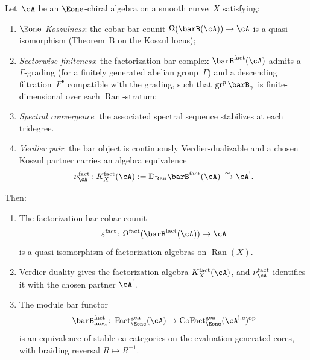 \begin{theorem}
\label{thm:h-level-factorization-kd}
Let~$\cA$ be an $\Eone$-chiral algebra on a smooth curve~$X$
satisfying:
\begin{enumerate}[label=\textup{(H\arabic*)}]
\item\label{h1:koszulness} \emph{$\Eone$-Koszulness}: the cobar-bar
 counit
 $\Omega(\barB(\cA)) \to \cA$ is a quasi-isomorphism
 \textup{(}Theorem~B on the Koszul locus\textup{)};
\item\label{h2:sectorwise} \emph{Sectorwise finiteness}: the
 factorization bar complex $\barB^{\mathrm{fact}}(\cA)$ admits a
 $\Gamma$-grading \textup{(}for a finitely generated abelian
 group~$\Gamma$\textup{)} and a descending
 filtration~$F^\bullet$ compatible with the grading, such that
 $\operatorname{gr}^p \barB_\gamma$ is finite-dimensional
 over each $\operatorname{Ran}$-stratum;
\item\label{h3:convergence} \emph{Spectral convergence}: the
associated spectral sequence stabilizes at each tridegree.
\item\label{h4:verdier-pair} \emph{Verdier pair}: the bar object is
 continuously Verdier-dualizable and a chosen Koszul partner carries
 an algebra equivalence
 \[
 \nu_\cA^{\mathrm{fact}}\colon
 K_X^{\mathrm{fact}}(\cA):=
 \mathbb D_{\mathrm{Ran}}\barB^{\mathrm{fact}}(\cA)
 \xrightarrow{\sim}\cA^!.
 \]
\end{enumerate}
Then:
\begin{enumerate}[label=\textup{(\roman*)}]
\item The factorization bar-cobar counit
 \[
 \varepsilon^{\mathrm{fact}}\colon
 \Omega^{\mathrm{fact}}(\barB^{\mathrm{fact}}(\cA)) \to \cA
 \]
 is a quasi-isomorphism of factorization algebras on
 $\operatorname{Ran}(X)$.
\item Verdier duality gives the factorization algebra
 $K_X^{\mathrm{fact}}(\cA)$, and
 $\nu_\cA^{\mathrm{fact}}$ identifies it with the chosen partner
 $\cA^!$.
\item The module bar functor
 \[
 \barB_{\mathrm{mod}}^{\mathrm{fact}}\colon
 \operatorname{Fact}_{\Eone}^{\mathrm{gen}}(\cA)
 \to
 \operatorname{CoFact}_{\Eone}^{\mathrm{gen}}
 (\cA^{!,c})^{\mathrm{op}}
 \]
 is an equivalence of stable $\infty$-categories on the
 evaluation-generated cores, with braiding reversal
 $R \mapsto R^{-1}$.
\end{enumerate}
\end{theorem}

